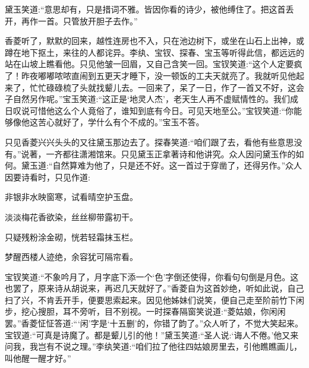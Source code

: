 \begin{parag}
    黛玉笑道:“意思却有，只是措词不雅。皆因你看的诗少，被他缚住了。把这首丢开，再作一首。只管放开胆子去作。”
\end{parag}


\begin{parag}
    香菱听了，默默的回来，越性连房也不入，只在池边树下，或坐在山石上出神，或蹲在地下抠土，来往的人都诧异。李纨、宝钗、探春、宝玉等听得此信，都远远的站在山坡上瞧看他。只见他皱一回眉，又自己含笑一回。宝钗笑道:“这个人定要疯了！昨夜嘟嘟哝哝直闹到五更天才睡下，没一顿饭的工夫天就亮了。我就听见他起来了，忙忙碌碌梳了头就找颦儿去。一回来了，呆了一日，作了一首又不好，这会子自然另作呢。”宝玉笑道:“这正是‘地灵人杰’，老天生人再不虚赋情性的。我们成日叹说可惜他这么个人竟俗了，谁知到底有今日。可见天地至公。”宝钗笑道:“你能够像他这苦心就好了，学什么有个不成的。”宝玉不答。
\end{parag}


\begin{parag}
    只见香菱兴兴头头的又往黛玉那边去了。探春笑道:“咱们跟了去，看他有些意思没有。”说著，一齐都往潇湘馆来。只见黛玉正拿著诗和他讲究。众人因问黛玉作的如何。黛玉道:“自然算难为他了，只是还不好。这一首过于穿凿了，还得另作。”众人因要诗看时，只见作道:
\end{parag}


\begin{poem}
    \begin{pl}非银非水映窗寒，试看晴空护玉盘。\end{pl}

    \begin{pl}淡淡梅花香欲染，丝丝柳带露初干。\end{pl}

    \begin{pl}只疑残粉涂金砌，恍若轻霜抹玉栏。\end{pl}

    \begin{pl}梦醒西楼人迹绝，余容犹可隔帘看。\end{pl}
\end{poem}


\begin{parag}
    宝钗笑道:“不象吟月了，月字底下添一个‘色’字倒还使得，你看句句倒是月色。这也罢了，原来诗从胡说来，再迟几天就好了。”香菱自为这首妙绝，听如此说，自己扫了兴，不肯丢开手，便要思索起来。因见他姊妹们说笑，便自己走至阶前竹下闲步，挖心搜胆，耳不旁听，目不别视。一时探春隔窗笑说道:“菱姑娘，你闲闲罢。”香菱怔怔答道:“‘闲’字是‘十五删’的，你错了韵了。”众人听了，不觉大笑起来。宝钗道:“可真是诗魔了。都是颦儿引的他！”黛玉笑道:“圣人说:‘诲人不倦。’他又来问我，我岂有不说之理。”李纨笑道:“咱们拉了他往四姑娘房里去，引他瞧瞧画儿，叫他醒一醒才好。”
\end{parag}


